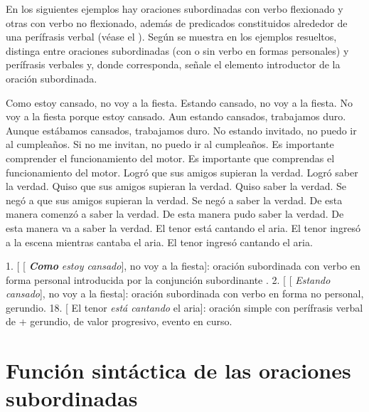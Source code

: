 \begin{ejercicio}\label{ej:13-perifrasis}
En los siguientes ejemplos hay oraciones subordinadas con verbo flexionado y
otras con verbo no flexionado, además de predicados constituidos alrededor de una
perífrasis verbal (véase el ). Según se muestra en los ejemplos
resueltos, distinga entre oraciones subordinadas (con o sin verbo en formas
personales) y perífrasis verbales y, donde corresponda, señale el elemento
introductor de la oración subordinada.

\begin{exe}
  \ex Como estoy cansado, no voy a la fiesta.
  \ex Estando cansado, no voy a la fiesta.
  \ex No voy a la fiesta porque estoy cansado.
  \ex Aun estando cansados, trabajamos duro.
  \ex Aunque estábamos cansados, trabajamos duro.
  \ex No estando invitado, no puedo ir al cumpleaños. Si no me invitan, no puedo
      ir al cumpleaños.
  \ex Es importante comprender el funcionamiento del motor.
  \ex Es importante que comprendas el funcionamiento del motor.
  \ex Logró que sus amigos supieran la verdad.
  \ex Logró saber la verdad.
  \ex Quiso que sus amigos supieran la verdad.
  \ex Quiso saber la verdad.
  \ex Se negó a que sus amigos supieran la verdad.
  \ex Se negó a saber la verdad.
  \ex De esta manera comenzó a saber la verdad.
  \ex De esta manera pudo saber la verdad.
  \ex De esta manera va a saber la verdad.
  \ex El tenor está cantando el aria.
  \ex El tenor ingresó a la escena mientras cantaba el aria.
  \ex El tenor ingresó cantando el aria.
\end{exe}

\begin{resuelto}
1. [ [ \textbf{\textit{Como}} \textit{estoy cansado}], no voy a
la fiesta]: oración subordinada con verbo en forma personal introducida por la
conjunción subordinante . 2. [ [ \textit{Estando
cansado}], no voy a la fiesta]: oración subordinada con verbo en forma no
personal, gerundio. 18. [ El tenor \textit{está cantando} el aria]:
oración simple con perífrasis verbal de  + gerundio, de valor
progresivo, evento en curso.
\end{resuelto}
\end{ejercicio}

\section{Función sintáctica de las oraciones subordinadas}\label{sec:13-funcion}


